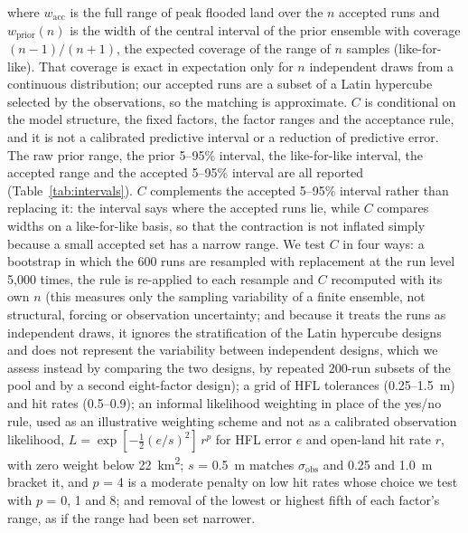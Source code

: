 \documentclass[preprint,12pt,authoryear]{elsarticle}
\newcommand{\kmsq}{km\textsuperscript{2}}
\begin{document}
where $w_\mathrm{acc}$ is the full range of peak flooded land over the $n$ accepted runs and $w_\mathrm{prior}(n)$ is the width of the central interval of the prior ensemble with coverage $(n-1)/(n+1)$, the expected coverage of the range of $n$ samples (like-for-like). That coverage is exact in expectation only for $n$ independent draws from a continuous distribution; our accepted runs are a subset of a Latin hypercube selected by the observations, so the matching is approximate. $C$ is conditional on the model structure, the fixed factors, the factor ranges and the acceptance rule, and it is not a calibrated predictive interval or a reduction of predictive error. The raw prior range, the prior 5--95\% interval, the like-for-like interval, the accepted range and the accepted 5--95\% interval are all reported (Table~\ref{tab:intervals}). $C$ complements the accepted 5--95\% interval rather than replacing it: the interval says where the accepted runs lie, while $C$ compares widths on a like-for-like basis, so that the contraction is not inflated simply because a small accepted set has a narrow range. We test $C$ in four ways: a bootstrap in which the 600 runs are resampled with replacement at the run level 5,000 times, the rule is re-applied to each resample and $C$ recomputed with its own $n$ (this measures only the sampling variability of a finite ensemble, not structural, forcing or observation uncertainty; and because it treats the runs as independent draws, it ignores the stratification of the Latin hypercube designs and does not represent the variability between independent designs, which we assess instead by comparing the two designs, by repeated 200-run subsets of the pool and by a second eight-factor design); a grid of HFL tolerances (0.25--1.5~m) and hit rates (0.5--0.9); an informal likelihood weighting in place of the yes/no rule, used as an illustrative weighting scheme and not as a calibrated observation likelihood, $L = \exp[-\tfrac12(e/s)^2]\,r^p$ for HFL error $e$ and open-land hit rate $r$, with zero weight below 22~\kmsq; $s$ = 0.5~m matches $\sigma_\mathrm{obs}$ and 0.25 and 1.0~m bracket it, and $p$ = 4 is a moderate penalty on low hit rates whose choice we test with $p$ = 0, 1 and 8; and removal of the lowest or highest fifth of each factor's range, as if the range had been set narrower.
\end{document}
